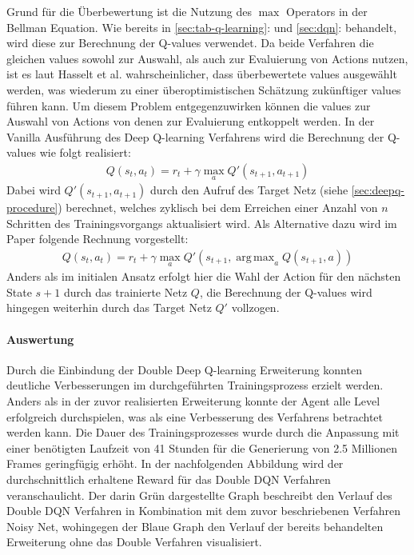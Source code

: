 \documentclass[11pt]{scrartcl}
\DeclareMathOperator*{\argmax}{arg\,max}
\begin{document}
Grund für die Überbewertung ist die Nutzung des $\max$ Operators in der Bellman Equation.
Wie bereits in \autoref{sec:tab-q-learning}: und \autoref{sec:dqn}:
 behandelt, wird diese zur Berechnung der Q-values verwendet. Da beide
Verfahren die gleichen values sowohl zur Auswahl, als auch zur Evaluierung von Actions nutzen,
ist es laut Hasselt et al.\cite[~S.2]{HGD2015} wahrscheinlicher, dass überbewertete values
ausgewählt werden, was wiederum zu einer überoptimistischen Schätzung zu\-künf\-ti\-ger values
führen kann. Um diesem Problem entgegenzuwirken können die values zur Auswahl von Actions von
denen zur Evaluierung entkoppelt werden. In der Vanilla Ausführung des Deep Q-learning
Verfahrens wird die Berechnung der Q-values wie folgt realisiert:
\begin{align}
Q(s_t, a_t) = r_t + \gamma\max_{a}Q'(s_{t+1},a_{t+1})
\label{aln:double-dqn-q-values}
\end{align}
Dabei wird $Q'(s_{t+1}, a_{t+1})$ durch den Aufruf des Target Netz (siehe 
\autoref{sec:deepq-procedure}) berechnet, welches zyklisch bei dem Erreichen einer Anzahl von
$n$ Schritten des Trainingsvorgangs aktualisiert wird. Als Alternative dazu wird im Paper
folgende Rechnung vorgestellt:
\begin{align}
Q(s_t, a_t) = r_t + \gamma\max_{a}Q'(s_{t+1},\argmax_{a}Q(s_{t+1},a))
\label{aln:double-dqn-q-values-improved}
\end{align}
Anders als im initialen Ansatz erfolgt hier die Wahl der Action für den nächsten State $s+1$
durch das trainierte Netz $Q$, die Berechnung der Q-values wird hingegen weiterhin durch das
Target Netz $Q'$ vollzogen.

\paragraph*{Auswertung}
\noindent
\newline
Durch die Einbindung der Double Deep Q-learning Erweiterung konnten deutliche
Verbesserungen im durchgeführten Trainingsprozess erzielt werden. Anders als in der zuvor
realisierten Erweiterung konnte der Agent alle Level erfolgreich durchspielen, was als
eine Verbesserung des Verfahrens betrachtet werden kann. Die Dauer des Trainingsprozesses
wurde durch die Anpassung mit einer benötigten Laufzeit von 41 Stunden für die Generierung
von 2.5 Millionen Frames geringfügig erhöht. In der nachfolgenden Abbildung wird der
durchschnittlich erhaltene Reward für das Double DQN Verfahren veranschaulicht. Der darin
Grün dargestellte Graph beschreibt den Verlauf des Double DQN Verfahren in Kombination
mit dem zuvor beschriebenen Verfahren Noisy Net, wohingegen der Blaue Graph den Verlauf
der bereits behandelten Erweiterung ohne das Double Verfahren visualisiert.
\end{document}
